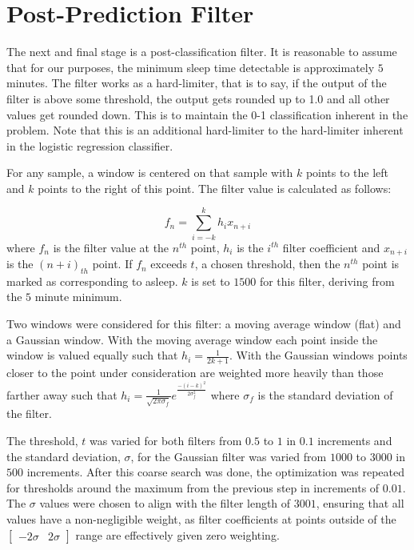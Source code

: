         \section{Post-Prediction Filter}

            The next and final stage is a post-classification filter. It is reasonable to assume that for our purposes, the minimum sleep time detectable is approximately $5$ minutes. The filter works as a hard-limiter, that is to say, if the output of the filter is above some threshold, the output gets rounded up to 1.0 and all other values get rounded down. This is to maintain the 0-1 classification inherent in the problem. Note that this is an additional hard-limiter to the hard-limiter inherent in the logistic regression classifier.

            For any sample, a window is centered on that sample with $k$ points to the left and $k$ points to the right of this point. The filter value is calculated as follows:

            \begin{equation}
                f_n = \sum_{i=-k}^k h_ix_{n+i}
            \end{equation}
            where $f_n$ is the filter value at the $n^{th}$ point, $h_i$ is the $i^{th}$ filter coefficient and $x_{n+i}$ is the $(n+i)_{th}$ point. If $f_n$ exceeds $t$, a chosen threshold, then the $n^{th}$ point is marked as corresponding to asleep. $k$ is set to $1500$ for this filter, deriving from the $5$ minute minimum. 

            Two windows were considered for this filter: a moving average window (flat) and a Gaussian window. With the moving average window each point inside the window is valued equally such that $h_i = \frac{1}{2k + 1}$. With the Gaussian windows points closer to the point under consideration are weighted more heavily than those farther away such that $h_i = \frac{1}{\sqrt{2\pi \sigma_f}}e^{\frac{-(i-k)^2}{2\sigma_f^2}}$ where $\sigma_f$ is the standard deviation of the filter.

            The threshold, $t$ was varied for both filters from $0.5$ to $1$ in $0.1$ increments and the standard deviation, $\sigma$, for the Gaussian filter was varied from $1000$ to $3000$ in $500$ increments. After this coarse search was done, the optimization was repeated for thresholds around the maximum from the previous step in increments of $0.01$. The $\sigma$ values were chosen to align with the filter length of $3001$, ensuring that all values have a non-negligible weight, as filter coefficients at points outside of the $\begin{bmatrix}-2\sigma & 2\sigma \end{bmatrix}$ range are effectively given zero weighting.

